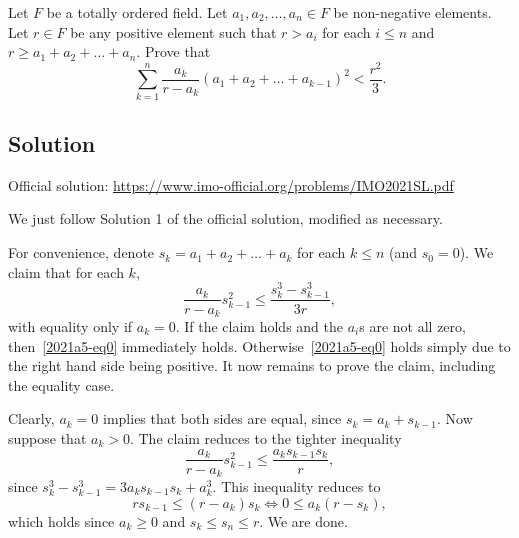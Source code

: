 Let $F$ be a totally ordered field.
Let $a_1, a_2, \ldots, a_n \in F$ be non-negative elements.
Let $r \in F$ be any positive element such that $r > a_i$ for each $i \leq n$ and $r \geq a_1 + a_2 + \ldots + a_n$.
Prove that
\[ \sum_{k = 1}^n \frac{a_k}{r - a_k} (a_1 + a_2 + \ldots + a_{k - 1})^2 < \frac{r^2}{3}. \tag{*}\label{2021a5-eq0} \]



\subsection*{Solution}

Official solution: \url{https://www.imo-official.org/problems/IMO2021SL.pdf}

We just follow Solution 1 of the official solution, modified as necessary.

For convenience, denote $s_k = a_1 + a_2 + \ldots + a_k$ for each $k \leq n$ (and $s_0 = 0$).
We claim that for each $k$,
\[ \frac{a_k}{r - a_k} s_{k - 1}^2 \leq \frac{s_k^3 - s_{k - 1}^3}{3r}, \]
    with equality only if $a_k = 0$.
If the claim holds and the $a_i$s are not all zero, then~\eqref{2021a5-eq0} immediately holds.
Otherwise~\eqref{2021a5-eq0} holds simply due to the right hand side being positive.
It now remains to prove the claim, including the equality case.

Clearly, $a_k = 0$ implies that both sides are equal, since $s_k = a_k + s_{k - 1}$.
Now suppose that $a_k > 0$.
The claim reduces to the tighter inequality
\[ \frac{a_k}{r - a_k} s_{k - 1}^2 \leq \frac{a_k s_{k - 1} s_k}{r}, \]
    since $s_k^3 - s_{k - 1}^3 = 3 a_k s_{k - 1} s_k + a_k^3$.
This inequality reduces to
\[ r s_{k - 1} \leq (r - a_k) s_k \iff 0 \leq a_k (r - s_k), \]
    which holds since $a_k \geq 0$ and $s_k \leq s_n \leq r$.
We are done.
